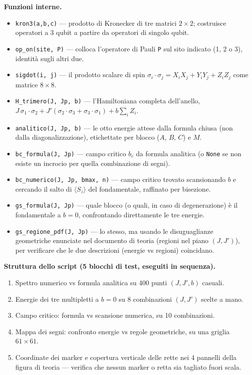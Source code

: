\documentclass[11pt,a4paper]{article}
\begin{document}
\textbf{Funzioni interne.}
\begin{itemize}
\item \texttt{kron3(a,b,c)} — prodotto di Kronecker di tre matrici $2\times2$;
costruisce operatori a 3 qubit a partire da operatori di singolo qubit.
\item \texttt{op\_on(site,\ P)} — colloca l'operatore di Pauli \texttt{P} sul sito
indicato (1, 2 o 3), identità sugli altri due.
\item \texttt{sigdot(i,\ j)} — il prodotto scalare di spin
$\sigma_i\cdot\sigma_j=X_iX_j+Y_iY_j+Z_iZ_j$ come matrice $8\times8$.
\item \texttt{H\_trimero(J,\ Jp,\ b)} — l'Hamiltoniana completa dell'anello,
$J\,\sigma_1\cdot\sigma_2+J'(\sigma_2\cdot\sigma_3+\sigma_3\cdot\sigma_1)+b\sum_iZ_i$.
\item \texttt{analitico(J,\ Jp,\ b)} — le otto energie attese dalla formula chiusa
(non dalla diagonalizzazione), etichettate per blocco ($A$, $B$, $C$) e $M$.
\item \texttt{bc\_formula(J,\ Jp)} — campo critico $b_c$ da formula analitica (o
\texttt{None} se non esiste un incrocio per quella combinazione di segni).
\item \texttt{bc\_numerico(J,\ Jp,\ bmax,\ n)} — campo critico trovato scansionando
$b$ e cercando il salto di $\langle S_z\rangle$ del fondamentale, raffinato per
bisezione.
\item \texttt{gs\_formula(J,\ Jp)} — quale blocco (o quali, in caso di degenerazione)
è il fondamentale a $b=0$, confrontando direttamente le tre energie.
\item \texttt{gs\_regione\_pdf(J,\ Jp)} — lo stesso, ma usando le disuguaglianze
geometriche enunciate nel documento di teoria (regioni nel piano $(J,J')$), per
verificare che le due descrizioni (energie vs regioni) coincidano.
\end{itemize}

\textbf{Struttura dello script (5 blocchi di test, eseguiti in sequenza).}
\begin{enumerate}
\item Spettro numerico vs formula analitica su 400 punti $(J,J',b)$ casuali.
\item Energie dei tre multipletti a $b=0$ su 8 combinazioni $(J,J')$ scelte a mano.
\item Campo critico: formula vs scansione numerica, su 10 combinazioni.
\item Mappa dei segni: confronto energie vs regole geometriche, su una griglia
$61\times61$.
\item Coordinate dei marker e copertura verticale delle rette nei 4 pannelli della
figura di teoria — verifica che nessun marker o retta sia tagliato fuori scala.
\end{enumerate}
\end{document}
